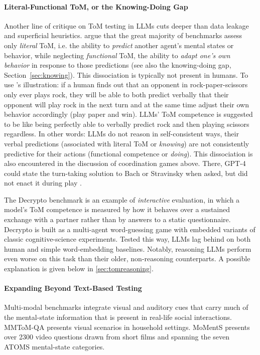 
\paragraph{Literal-Functional ToM, or the Knowing-Doing Gap}
Another line of critique on ToM testing in LLMs cuts deeper than data leakage and superficial heuristics. \citet{riemer2024position} argue that the great majority of benchmarks assess only \emph{literal} ToM, i.e. the ability to \emph{predict} another agent's mental states or behavior, while neglecting \emph{functional} ToM, the ability to \emph{adapt one's own behavior} in response to those predictions (see also the knowing-doing gap, Section~\ref{sec:knowing}). This dissociation is typically not present in humans. To use \citet{riemer2024position}'s illustration: if a human finds out that an opponent in rock-paper-scissors only ever plays rock, they will be able to both predict verbally that their opponent will play rock  in the next turn and at the same time adjust their own behavior accordingly (play paper and win). LLMs' ToM competence is suggested to be like being perfectly able to verbally predict rock and then playing scissors regardless. In other words: LLMs do not reason in self-consistent ways, their verbal predictions (associated with literal ToM or {\em knowing}) are not consistently predictive for their actions (functional competence or {\em doing}). This dissociation is also encountered in the discussion of coordination games above. There, GPT-4 could state the turn-taking solution to Bach or Stravinsky when asked, but did not enact it during play \citep{akata2025playing}.

The Decrypto benchmark \citep{lupu2025decrypto} is an example of \emph{interactive} evaluation, in which a model's ToM competence is measured by how it behaves over a sustained exchange with a partner rather than by answers to a static questionnaire. Decrypto is built as a multi-agent word-guessing game with embedded variants of classic cognitive-science experiments. Tested this way, LLMs lag behind on both human and simple word-embedding baselines. Notably, reasoning LLMs perform even worse on this task than their older, non-reasoning counterparts. A possible explanation is given below in \ref{sec:tomreasoning}.

\paragraph{Expanding Beyond Text-Based Testing}
Multi-modal benchmarks integrate visual and auditory cues that carry much of the mental-state information that is present in real-life social  interactions. MMToM-QA \cite{jin2024mmtomqamultimodaltheorymind} presents visual scenarios in household settings. MoMentS \citep{villa2025moments} presents over 2300 video questions drawn from short films and spanning the seven ATOMS mental-state categories. 

